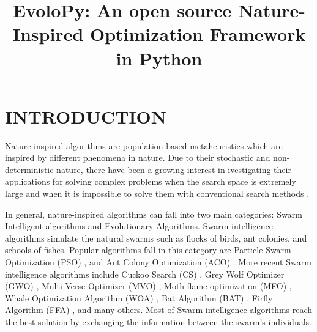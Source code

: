 \documentclass[a4paper,twoside]{article}
\begin{document}
\title{EvoloPy: An open source Nature-Inspired Optimization Framework in Python}

\author{
}




\onecolumn \maketitle \normalsize \vfil
\section{\uppercase{Introduction}}

\label{sec:introduction}


Nature-inspired algorithms are population based metaheuristics which are inspired by different phenomena in nature. Due to their stochastic and non-deterministic nature, there have been a growing interest in ivestigating their applications for solving complex problems when the search space is extremely large and when it is impossible to solve them with conventional search methods \cite{Yang_2013}. 

In general, nature-inspired algorithms can fall into two main categories: Swarm Intelligent algorithms and Evolutionary Algorithms. Swarm intelligence algorithms simulate the natural swarms such as flocks of birds, ant colonies, and schools of fishes. Popular algorithms fall in this category are Particle Swarm Optimization (PSO) \cite{Kennedy95}, and Ant Colony Optimization (ACO) \cite{Koro_ec_2009}. More recent Swarm intelligence algorithms include Cuckoo Search (CS) \cite{Yang2009}, Grey Wolf Optimizer (GWO) \cite{Mirjalili201446}, Multi-Verse Optimizer (MVO) \cite{Mirjalili2016}, Moth-flame optimization (MFO) \cite{Mirjalili2015228}, Whale Optimization Algorithm (WOA) \cite{Mirjalili201651}, Bat Algorithm (BAT) \cite{Yang2010}, Firfly Algorithm (FFA) \cite{Yang2010FFA}, and many others. Most of Swarm intelligence algorithms reach the best solution by exchanging the information between the swarm's individuals. 
\end{document}
